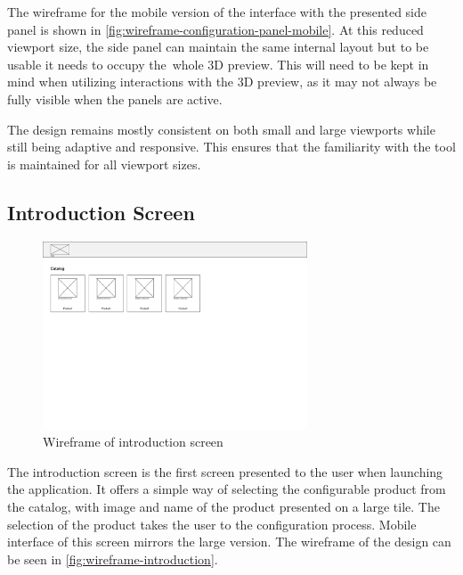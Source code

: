 The wireframe for the mobile version of the interface with the presented side panel is shown in \autoref{fig:wireframe-configuration-panel-mobile}. At this reduced viewport size, the side panel can maintain the same internal layout but to be usable it needs to occupy the~whole 3D preview. This will need to be kept in mind when utilizing interactions with the 3D preview, as it may not always be fully visible when the panels are active. 

The design remains mostly consistent on both small and large viewports while still being adaptive and responsive. This ensures that the familiarity with the tool is maintained for all viewport sizes.

\subsection{Introduction Screen}

\begin{figure}[h!]
\centering
\includegraphics[width=0.7\textwidth]{images/wireframe_introduction_default.png}
\caption{Wireframe of introduction screen}
\label{fig:wireframe-introduction}
\end{figure}

The introduction screen is the first screen presented to the user when launching the application. It offers a simple way of selecting the configurable product from the catalog, with image and name of the product presented on a large tile. The selection of the product takes the user to the configuration process. Mobile interface of this screen mirrors the large version. The wireframe of the design can be seen in \autoref{fig:wireframe-introduction}.

